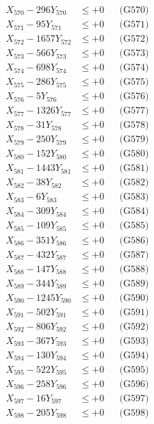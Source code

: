 \documentclass[a4paper,10pt]{article}
\begin{document}
{\begin{align}
X_{570} - 296Y_{570} &\leq +0 && \text{(G570)} \\
\allowbreak
X_{571} - 95Y_{571} &\leq +0 && \text{(G571)} \\
X_{572} - 1657Y_{572} &\leq +0 && \text{(G572)} \\
X_{573} - 566Y_{573} &\leq +0 && \text{(G573)} \\
X_{574} - 698Y_{574} &\leq +0 && \text{(G574)} \\
X_{575} - 286Y_{575} &\leq +0 && \text{(G575)} \\
X_{576} - 5Y_{576} &\leq +0 && \text{(G576)} \\
X_{577} - 1326Y_{577} &\leq +0 && \text{(G577)} \\
X_{578} - 31Y_{578} &\leq +0 && \text{(G578)} \\
X_{579} - 250Y_{579} &\leq +0 && \text{(G579)} \\
X_{580} - 152Y_{580} &\leq +0 && \text{(G580)} \\
\allowbreak
X_{581} - 1443Y_{581} &\leq +0 && \text{(G581)} \\
X_{582} - 38Y_{582} &\leq +0 && \text{(G582)} \\
X_{583} - 6Y_{583} &\leq +0 && \text{(G583)} \\
X_{584} - 309Y_{584} &\leq +0 && \text{(G584)} \\
X_{585} - 109Y_{585} &\leq +0 && \text{(G585)} \\
X_{586} - 351Y_{586} &\leq +0 && \text{(G586)} \\
X_{587} - 432Y_{587} &\leq +0 && \text{(G587)} \\
X_{588} - 147Y_{588} &\leq +0 && \text{(G588)} \\
X_{589} - 344Y_{589} &\leq +0 && \text{(G589)} \\
X_{590} - 1245Y_{590} &\leq +0 && \text{(G590)} \\
\allowbreak
X_{591} - 502Y_{591} &\leq +0 && \text{(G591)} \\
X_{592} - 806Y_{592} &\leq +0 && \text{(G592)} \\
X_{593} - 367Y_{593} &\leq +0 && \text{(G593)} \\
X_{594} - 130Y_{594} &\leq +0 && \text{(G594)} \\
X_{595} - 522Y_{595} &\leq +0 && \text{(G595)} \\
X_{596} - 258Y_{596} &\leq +0 && \text{(G596)} \\
X_{597} - 16Y_{597} &\leq +0 && \text{(G597)} \\
X_{598} - 205Y_{598} &\leq +0 && \text{(G598)} \\

\end{align}}
\end{document}

